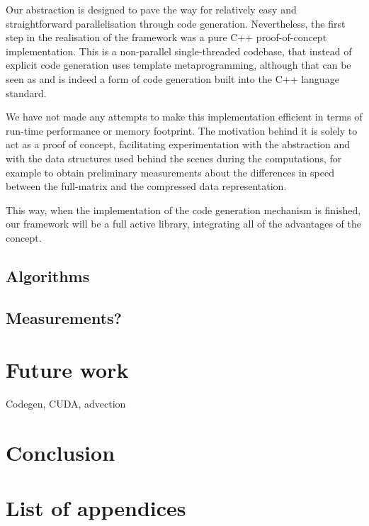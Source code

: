 \documentclass[fontsize=11pt, appendixprefix=true]{scrreprt}
\begin{document}
Our abstraction is designed to pave the way for relatively easy and
straightforward parallelisation through code generation. Nevertheless, the first
step in the realisation of the framework was a pure C++ proof-of-concept
implementation. This is a non-parallel single-threaded codebase, that instead of
explicit code generation uses template metaprogramming, although that can be
seen as and is indeed a form of code generation built into the C++ language
standard.

We have not made any attempts to make this implementation efficient in terms of
run-time performance or memory footprint. The motivation behind it is solely to
act as a proof of concept, facilitating experimentation with the abstraction and
with the data structures used behind the scenes during the computations, for
example to obtain preliminary measurements about the differences in speed
between the full-matrix and the compressed data representation.

This way, when the implementation of the code generation mechanism is finished,
our framework will be a full active library, integrating all of the advantages
of the concept.

\section{Algorithms}


\section{Measurements?}

\chapter{Future work}

Codegen, CUDA, advection

\chapter{Conclusion}

\printbibliography
\appendix
\chapter{List of appendices}
\end{document}
